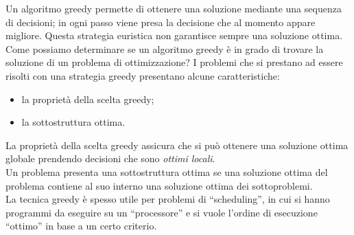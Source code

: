 \documentclass[12pt]{report}
\begin{document}
 Un algoritmo greedy permette di ottenere una soluzione mediante una sequenza di decisioni; in ogni passo viene presa la decisione che al momento appare migliore. Questa strategia euristica non garantisce sempre una soluzione ottima. \\
 Come possiamo determinare se un algoritmo greedy è in grado di trovare la soluzione di un problema di ottimizzazione? I problemi che si prestano ad essere risolti con una strategia greedy presentano alcune caratteristiche:
 \begin{itemize}
 	\item la proprietà della scelta greedy;
 	\item la sottostruttura ottima.
 \end{itemize}
 La proprietà della scelta greedy assicura che si può ottenere una soluzione ottima globale prendendo decisioni che sono \textit{ottimi locali}.\\
 Un problema presenta una sottostruttura ottima se una soluzione ottima del problema contiene al suo interno una soluzione ottima dei sottoproblemi. \\
 La tecnica greedy è spesso utile per problemi di  ``scheduling'', in cui si hanno programmi da eseguire su un ``processore'' e si vuole l'ordine di esecuzione ``ottimo'' in base a un certo criterio.
\end{document}
